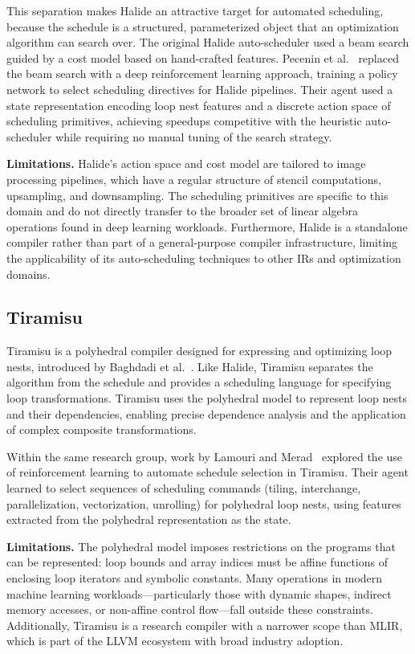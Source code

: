 This separation makes Halide an attractive target for automated scheduling, because the schedule is a structured, parameterized object that an optimization algorithm can search over. The original Halide auto-scheduler used a beam search guided by a cost model based on hand-crafted features. Pecenin et al.~\cite{pecenin2019halide} replaced the beam search with a deep reinforcement learning approach, training a policy network to select scheduling directives for Halide pipelines. Their agent used a state representation encoding loop nest features and a discrete action space of scheduling primitives, achieving speedups competitive with the heuristic auto-scheduler while requiring no manual tuning of the search strategy.

\textbf{Limitations.} Halide's action space and cost model are tailored to image processing pipelines, which have a regular structure of stencil computations, upsampling, and downsampling. The scheduling primitives are specific to this domain and do not directly transfer to the broader set of linear algebra operations found in deep learning workloads. Furthermore, Halide is a standalone compiler rather than part of a general-purpose compiler infrastructure, limiting the applicability of its auto-scheduling techniques to other IRs and optimization domains.

\subsection{Tiramisu}

Tiramisu is a polyhedral compiler designed for expressing and optimizing loop nests, introduced by Baghdadi et al.~\cite{baghdadi2018tiramisu}. Like Halide, Tiramisu separates the algorithm from the schedule and provides a scheduling language for specifying loop transformations. Tiramisu uses the polyhedral model to represent loop nests and their dependencies, enabling precise dependence analysis and the application of complex composite transformations.

Within the same research group, work by Lamouri and Merad~\cite{lamouri2024tiramisu} explored the use of reinforcement learning to automate schedule selection in Tiramisu. Their agent learned to select sequences of scheduling commands (tiling, interchange, parallelization, vectorization, unrolling) for polyhedral loop nests, using features extracted from the polyhedral representation as the state.

\textbf{Limitations.} The polyhedral model imposes restrictions on the programs that can be represented: loop bounds and array indices must be affine functions of enclosing loop iterators and symbolic constants. Many operations in modern machine learning workloads—particularly those with dynamic shapes, indirect memory accesses, or non-affine control flow—fall outside these constraints. Additionally, Tiramisu is a research compiler with a narrower scope than MLIR, which is part of the LLVM ecosystem with broad industry adoption.

